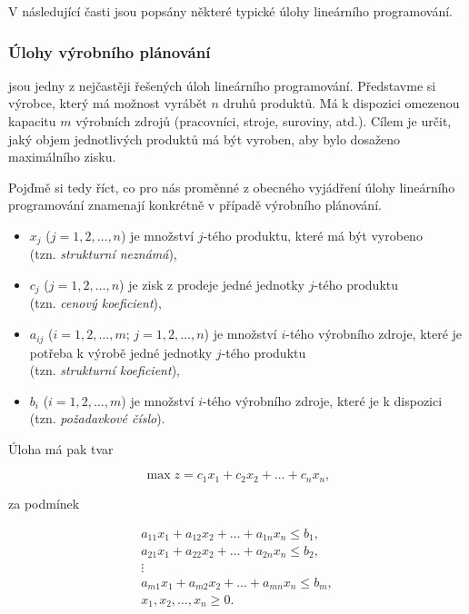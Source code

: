 V následující časti jsou popsány některé typické úlohy lineárního programování.

\subsubsection{Úlohy výrobního plánování}
jsou jedny z nejčastěji řešených úloh lineárního programování.
Představme si výrobce, který má možnost vyrábět $n$ druhů produktů.
Má k dispozici omezenou kapacitu $m$ výrobních zdrojů (pracovníci, stroje, suroviny, atd.).
Cílem je určit, jaký objem jednotlivých produktů má být vyroben, aby bylo dosaženo maximálního zisku.

Pojďmě si tedy říct, co pro nás proměnné z obecného vyjádření úlohy lineárního programování znamenají konkrétně v případě výrobního plánování.

\begin{itemize}[label={}]
    \item $x_j$ ($j = 1, 2, \ldots, n$) je množství $j$-tého produktu, které má být vyrobeno \\(tzn. \textit{strukturní neznámá}),
    \item $c_j$ ($j = 1, 2, \ldots, n$) je zisk z prodeje jedné jednotky $j$-tého produktu \\(tzn. \textit{cenový koeficient}),
    \item $a_{ij}$ ($i = 1, 2, \ldots, m$; $j = 1, 2, \ldots, n$) je množství $i$-tého výrobního zdroje, které je potřeba k výrobě jedné jednotky $j$-tého produktu \\(tzn. \textit{strukturní koeficient}),
    \item $b_i$ ($i = 1, 2, \ldots, m$) je množství $i$-tého výrobního zdroje, které je k dispozici \\(tzn. \textit{požadavkové číslo}).
\end{itemize}

Úloha má pak tvar

\begin{equation}
        \max z = c_1x_1 + c_2x_2 + \ldots + c_nx_n,
\end{equation}

za podmínek

\begin{equation}
    \begin{gathered}
        a_{11}x_1 + a_{12}x_2 + \ldots + a_{1n}x_n \leq b_1, \\
        a_{21}x_1 + a_{22}x_2 + \ldots + a_{2n}x_n \leq b_2, \\
        \vdots \\
        a_{m1}x_1 + a_{m2}x_2 + \ldots + a_{mn}x_n \leq b_m, \\
        x_1, x_2, \ldots, x_n \geq 0.
    \end{gathered}
\end{equation}

